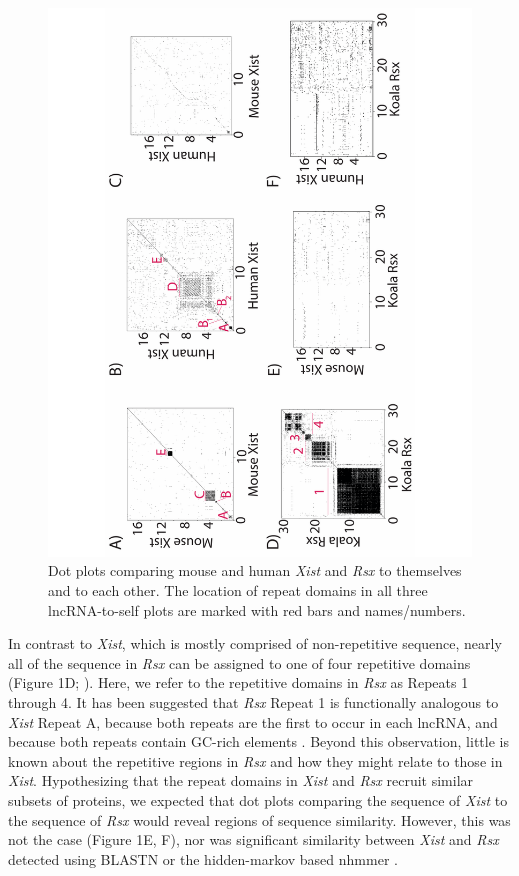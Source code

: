 \begin{figure}[!h]
\centering
\includegraphics[angle=-90, width=\textwidth]{images/fig1-v2-01.pdf}
\caption[\emph{\emph{Xist}} and \emph{\emph{Rsx}} dot plots]{Dot plots comparing mouse and human \emph{Xist} and \emph{Rsx} to themselves and to each other. The location of repeat domains in all three lncRNA-to-self plots are marked with red bars and names/numbers.}
\end{figure}

In contrast to \emph{Xist}, which is mostly comprised of non-repetitive sequence, nearly all of the sequence in \emph{Rsx} can be assigned to one of four repetitive domains (Figure 1D; \cite{Johnson2018AdaptationGenome}). Here, we refer to the repetitive domains in \emph{Rsx} as Repeats 1 through 4. It has been suggested that \emph{Rsx} Repeat 1 is functionally analogous to \emph{Xist} Repeat A, because both repeats are the first to occur in each lncRNA, and because both repeats contain GC-rich elements \cite{Grant2012RsxInactivation,Johnson2018AdaptationGenome}. Beyond this observation, little is known about the repetitive regions in \emph{Rsx} and how they might relate to those in \emph{Xist}. Hypothesizing that the repeat domains in \emph{Xist} and \emph{Rsx} recruit similar subsets of proteins, we expected that dot plots comparing the sequence of \emph{Xist} to the sequence of \emph{Rsx} would reveal regions of sequence similarity. However, this was not the case (Figure 1E, F), nor was significant similarity between \emph{Xist} and \emph{Rsx} detected using BLASTN or the hidden-markov based nhmmer \cite{Altschul1990BasicTool,Wheeler2013Nhmmer:HMMs}. 

